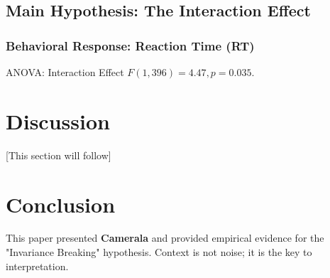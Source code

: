 \documentclass[journal]{IEEEtran}
\begin{document}
\subsection{Main Hypothesis: The Interaction Effect}
\subsubsection{Behavioral Response: Reaction Time (RT)}
ANOVA: Interaction Effect $F(1, 396) = 4.47, p = 0.035$.

\section{Discussion}
[This section will follow]

\section{Conclusion}
This paper presented \textbf{Camerala} and provided empirical evidence for the "Invariance Breaking" hypothesis. Context is not noise; it is the key to interpretation.



\end{document}
